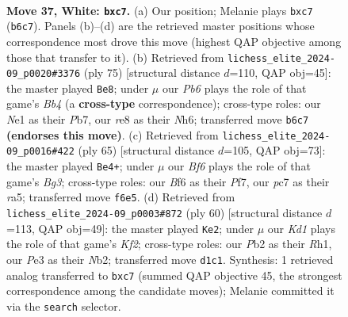 \documentclass[11pt]{article}
\begin{document}
\clearpage

\begin{figure}[p]\centering
\begin{subfigure}{0.46\textwidth}\centering
\resizebox{\linewidth}{!}{%
\newchessgame
\chessboard[
  setfen={r3r3/1kp5/pP3B2/1b1N1p2/4n2R/1B2P3/1P4P1/R2KN3 w - - 1 37},
  showmover=false,
  pgfstyle=straightmove, color=movearrow, markmove={b6-c7}
]}
\caption{}
\end{subfigure}\hfill
\begin{subfigure}{0.46\textwidth}\centering
\resizebox{\linewidth}{!}{%
\newchessgame
\chessboard[
  setfen={1k1r4/1p6/4B2n/1bnP2r1/p1p5/2P1N1P1/1R3P2/3R2K1 b - - 2 38},
  showmover=false,
  pgfstyle=straightmove, color=movearrow, markmove={b5-e8}
]}
\caption{}
\end{subfigure}
\\[4pt]
\begin{subfigure}{0.46\textwidth}\centering
\resizebox{\linewidth}{!}{%
\newchessgame
\chessboard[
  setfen={4r1k1/1pp2pp1/p5bp/R3N2n/5r2/PB6/1PP3KP/6R1 b - - 3 33},
  showmover=false,
  pgfstyle=straightmove, color=movearrow, markmove={g6-e4}
]}
\caption{}
\end{subfigure}\hfill
\begin{subfigure}{0.46\textwidth}\centering
\resizebox{\linewidth}{!}{%
\newchessgame
\chessboard[
  setfen={r2rb3/4kp2/4p2p/p1b5/1nB3Pp/1P2PP2/1N1B1K2/R6R w - - 2 31},
  showmover=false,
  pgfstyle=straightmove, color=movearrow, markmove={f2-e2}
]}
\caption{}
\end{subfigure}
\caption{\textbf{Move 37, White: \texttt{bxc7}.} (a) Our position; Melanie plays \texttt{bxc7} (\texttt{b6c7}). Panels (b)--(d) are the retrieved master positions whose correspondence most drove this move (highest QAP objective among those that transfer to it). (b) Retrieved from \texttt{lichess\_elite\_2024-09\_p0020\#3376} (ply 75) [structural distance $d$=110, QAP obj=45]: the master played \texttt{Be8}; under $\mu$ our \emph{Pb6} plays the role of that game's \emph{Bb4} (a \textbf{cross-type} correspondence); cross-type roles: our \emph{N}e1 as their \emph{P}b7, our \emph{r}e8 as their \emph{N}h6; transferred move \texttt{b6c7} \textbf{(endorses this move)}. (c) Retrieved from \texttt{lichess\_elite\_2024-09\_p0016\#422} (ply 65) [structural distance $d$=105, QAP obj=73]: the master played \texttt{Be4+}; under $\mu$ our \emph{Bf6} plays the role of that game's \emph{Bg3}; cross-type roles: our \emph{B}f6 as their \emph{P}f7, our \emph{p}c7 as their \emph{r}a5; transferred move \texttt{f6e5}. (d) Retrieved from \texttt{lichess\_elite\_2024-09\_p0003\#872} (ply 60) [structural distance $d$=113, QAP obj=49]: the master played \texttt{Ke2}; under $\mu$ our \emph{Kd1} plays the role of that game's \emph{Kf2}; cross-type roles: our \emph{P}b2 as their \emph{R}h1, our \emph{P}e3 as their \emph{N}b2; transferred move \texttt{d1c1}. Synthesis: 1 retrieved analog transferred to \texttt{bxc7} (summed QAP objective 45, the strongest correspondence among the candidate moves); Melanie committed it via the \texttt{search} selector.}
\label{fig:thought-m72}
\end{figure}
\end{document}
